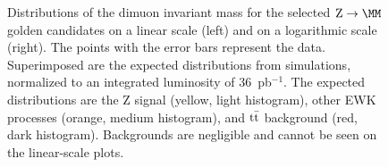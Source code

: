 \begin{figure}[hbtp]
\begin{minipage}{73mm}
\begin{center}
      \end{center}
    \end{minipage}
\caption{
Distributions of the dimuon invariant mass for the selected $\Zmm$ golden candidates on
a linear scale (left) and on a logarithmic scale (right).
The points with the error bars represent the data.
Superimposed are the expected distributions from simulations, normalized
to an integrated luminosity of $36$~pb$^{-1}$. The expected distributions are
the Z signal (yellow, light histogram), other EWK processes (orange, medium histogram),
and $\mathrm{t}\bar{\mathrm{t}}$ background (red, dark histogram).
Backgrounds are negligible and cannot be seen on the linear-scale plots.
}
\label{fig:zGolden36pb}
\end{figure}

